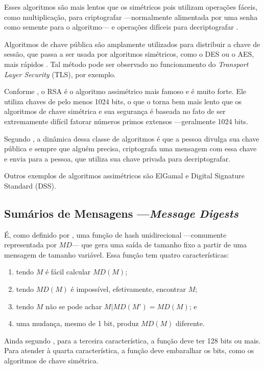 \documentclass[12px,a4paper,twoside]{article}
\begin{document}
Esses algoritmos são mais lentos que os simétricos pois utilizam operações
fáceis, como multiplicação, para criptografar ---normalmente alimentada por uma
senha como semente para o algoritmo--- e operações difíceis para decriptografar
\cite{tanenbaum}.

Algoritmos de chave pública são amplamente utilizados para distribuir a chave
de sessão, que passa a ser usada por algoritmos simétricos, como o DES ou o
AES, mais rápidos \cite{tanenbaum}.  Tal método pode ser observado no
funcionamento do \textit{Transport Layer Security} (TLS), por exemplo.

Conforme \cite{tanenbaum}, o RSA é o algoritmo assimétrico mais famoso e é
muito forte.  Ele utiliza chaves de pelo menos 1024 bits, o que o torna bem
mais lento que os algoritmos de chave simétrica e sua segurança é baseada no
fato de ser extremamente difícil fatorar números primos extensos ---geralmente
1024 bits.

Segundo \cite{uchoa}, a dinâmica dessa classe de algoritmos é que a pessoa
divulga sua chave pública e sempre que alguém precisa, criptografa uma mensagem
com essa chave e envia para a pessoa, que utiliza sua chave privada para
decriptografar.

Outros exemplos de algoritmos assimétricos são ElGamal e Digital Signature
Standard (DSS).

\subsection{Sumários de Mensagens ---\textit{Message Digests}}
\label{sec:teoria:sumarios}
É, como definido por \cite{tanenbaum}, uma função de hash unidirecional
---comumente representada por $MD$--- que gera uma saída de tamanho fixo a
partir de uma mensagem de tamanho variável.  Essa função tem quatro
características:

\begin{enumerate}
    \item tendo $M$ é fácil calcular $MD(M)$;
    \item tendo $MD(M)$ é impossível, efetivamente, encontrar $M$;
    \item tendo $M$ não se pode achar $M | MD(M') = MD(M)$; e
    \item uma mudança, mesmo de 1 bit, produz $MD(M)$ diferente.
\end{enumerate}

Ainda segundo \cite{tanenbaum}, para a terceira característica, a função deve
ter 128 bits ou mais.  Para atender à quarta característica, a função deve
embaralhar os bits, como os algoritmos de chave simétrica.
\end{document}
